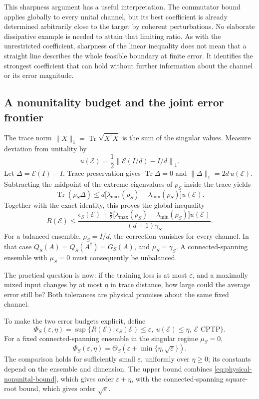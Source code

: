 \documentclass[11pt,a4paper]{article}
\newcommand{\Tr}{\operatorname{Tr}}
\numberwithin{equation}{section}
\begin{document}
This sharpness argument has a useful interpretation. The commutator bound applies globally to every unital channel, but its best coefficient is already determined arbitrarily close to the target by coherent perturbations. No elaborate dissipative example is needed to attain that limiting ratio. As with the unrestricted coefficient, sharpness of the linear inequality does not mean that a straight line describes the whole feasible boundary at finite error. It identifies the strongest coefficient that can hold without further information about the channel or its error magnitude.

\subsection{A nonunitality budget and the joint error frontier}

The trace norm $\|X\|_1=\Tr\sqrt{X^\dagger X}$ is the sum of the singular values. Measure deviation from unitality by
\[
 u(\mathcal E)=\frac12\left\|\mathcal E(I/d)-I/d\right\|_1.
\]
Let $\Delta=\mathcal E(I)-I$. Trace preservation gives $\Tr\Delta=0$ and $\|\Delta\|_1=2d\,u(\mathcal E)$. Subtracting the midpoint of the extreme eigenvalues of $\rho_S$ inside the trace yields
\[
 \Tr(\rho_S\Delta)
 \le d\bigl[\lambda_{\max}(\rho_S)
             -\lambda_{\min}(\rho_S)\bigr]u(\mathcal E).
\]
Together with the exact identity, this proves the global inequality
\begin{equation}
 R(\mathcal E)\le
 \frac{\epsilon_S(\mathcal E)
  +\frac d2\bigl[\lambda_{\max}(\rho_S)
             -\lambda_{\min}(\rho_S)\bigr]u(\mathcal E)}
 {(d+1)\gamma_S}.
 \label{eq:physical-nonunital-bound}
\end{equation}
For a balanced ensemble, $\rho_S=I/d$, the correction vanishes for every channel. In that case $Q_S(A)=Q_S(A^\dagger)=G_S(A)$, and $\mu_S=\gamma_S$. A connected-spanning ensemble with $\mu_S=0$ must consequently be unbalanced.

The practical question is now: if the training loss is at most
$\varepsilon$, and a maximally mixed input changes by at most $\eta$ in
trace distance, how large could the average error still be? Both tolerances
are physical promises about the same fixed channel.

To make the two error budgets explicit, define
\[
 \Phi_S(\varepsilon,\eta)
 =\sup\{R(\mathcal E):\epsilon_S(\mathcal E)\le\varepsilon,
                       \ u(\mathcal E)\le\eta,\ \mathcal E\text{ CPTP}\}.
\]
For a fixed connected-spanning ensemble in the singular regime $\mu_S=0$,
\begin{equation}
 \Phi_S(\varepsilon,\eta)
 =\Theta_S\!\left(\varepsilon+\min\{\eta,\sqrt\varepsilon\}\right).
 \label{eq:physical-frontier}
\end{equation}
The comparison holds for sufficiently small $\varepsilon$, uniformly over $\eta\ge0$; its constants depend on the ensemble and dimension. The upper bound combines \eqref{eq:physical-nonunital-bound}, which gives order $\varepsilon+\eta$, with the connected-spanning square-root bound, which gives order $\sqrt\varepsilon$.
\end{document}
